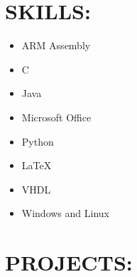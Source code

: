 \documentclass[line,margin]{res}
\begin{document}
\begin{resume}
\section{SKILLS:}
 		\begin{multicols}{2}
			\begin{itemize}
				\setlength{\itemindent}{-25pt}
				\item[] ARM Assembly
				\item[] C
				\item[] Java
				\item[] Microsoft Office
				\item[] \hspace{12.5pt} Python
				\item[] \hspace{12.5pt} \LaTeX
				\item[] \hspace{12.5pt} VHDL
				\item[] \hspace{12.5pt} Windows and Linux
			\end{itemize}
		\end{multicols}

\section{PROJECTS:}

	

\end{resume}
\end{document}
